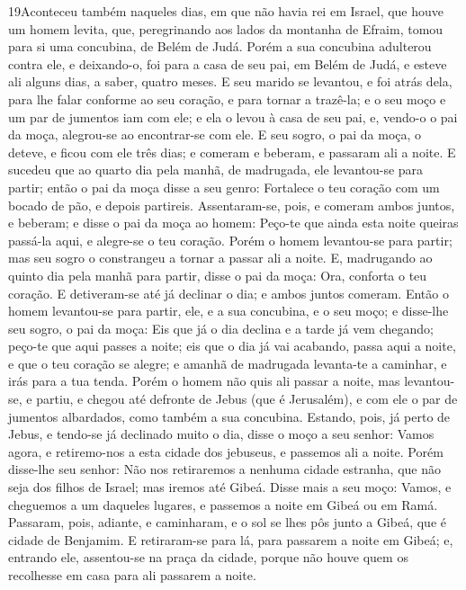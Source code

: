 \lettrine{19} Aconteceu também naqueles dias, em que não havia
rei em Israel, que houve um homem levita, que, peregrinando aos
lados da montanha de Efraim, tomou para si uma concubina, de Belém
de Judá. Porém a sua concubina adulterou contra ele, e
deixando-o, foi para a casa de seu pai, em Belém de Judá, e esteve
ali alguns dias, a saber, quatro meses. E seu marido se
levantou, e foi atrás dela, para lhe falar conforme ao seu coração,
e para tornar a trazê-la; e o seu moço e um par de jumentos iam com
ele; e ela o levou à casa de seu pai, e, vendo-o o pai da moça,
alegrou-se ao encontrar-se com ele. E seu sogro, o pai da moça,
o deteve, e ficou com ele três dias; e comeram e beberam, e passaram
ali a noite. E sucedeu que ao quarto dia pela manhã, de
madrugada, ele levantou-se para partir; então o pai da moça disse a
seu genro: Fortalece o teu coração com um bocado de pão, e depois
partireis. Assentaram-se, pois, e comeram ambos juntos, e
beberam; e disse o pai da moça ao homem: Peço-te que ainda esta
noite queiras passá-la aqui, e alegre-se o teu coração. Porém o
homem levantou-se para partir; mas seu sogro o constrangeu a tornar
a passar ali a noite. E, madrugando ao quinto dia pela manhã
para partir, disse o pai da moça: Ora, conforta o teu coração. E
detiveram-se até já declinar o dia; e ambos juntos comeram.
Então o homem levantou-se para partir, ele, e a sua concubina, e
o seu moço; e disse-lhe seu sogro, o pai da moça: Eis que já o dia
declina e a tarde já vem chegando; peço-te que aqui passes a noite;
eis que o dia já vai acabando, passa aqui a noite, e que o teu
coração se alegre; e amanhã de madrugada levanta-te a caminhar, e
irás para a tua tenda. Porém o homem não quis ali passar a
noite, mas levantou-se, e partiu, e chegou até defronte de Jebus
(que é Jerusalém), e com ele o par de jumentos albardados, como
também a sua concubina. Estando, pois, já perto de Jebus, e
tendo-se já declinado muito o dia, disse o moço a seu senhor: Vamos
agora, e retiremo-nos a esta cidade dos jebuseus, e passemos ali a
noite. Porém disse-lhe seu senhor: Não nos retiraremos a
nenhuma cidade estranha, que não seja dos filhos de Israel; mas
iremos até Gibeá. Disse mais a seu moço: Vamos, e cheguemos a
um daqueles lugares, e passemos a noite em Gibeá ou em Ramá.
Passaram, pois, adiante, e caminharam, e o sol se lhes pôs
junto a Gibeá, que é cidade de Benjamim. E retiraram-se para
lá, para passarem a noite em Gibeá; e, entrando ele, assentou-se na
praça da cidade, porque não houve quem os recolhesse em casa para
ali passarem a noite.

